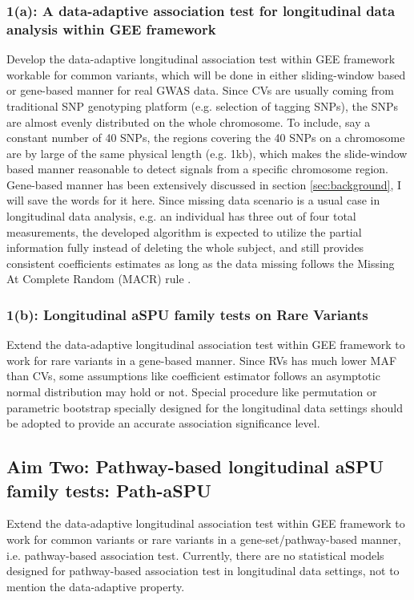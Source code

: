 \documentclass[12pt]{article}
\begin{document}
\subsubsection*{1(a): A data-adaptive association test for longitudinal data analysis within GEE framework}
Develop the data-adaptive longitudinal association test within GEE framework workable for common variants, which will be done in either sliding-window based or gene-based manner for real GWAS data. Since CVs are usually coming from traditional SNP genotyping platform (e.g. selection of tagging SNPs), the SNPs are almost evenly distributed on the whole chromosome. To include, say a constant number of 40 SNPs, the regions covering the 40 SNPs on a chromosome are by large of the same physical length (e.g. 1kb), which makes the slide-window based manner reasonable to detect signals from a specific chromosome region. Gene-based manner has been extensively discussed in section \ref{sec:background}, I will save the words for it here. Since missing data scenario is a usual case in longitudinal data analysis, e.g. an individual has three out of four total measurements, the developed algorithm is expected to utilize the partial information fully instead of deleting the whole subject, and still provides consistent coefficients estimates as long as the data missing follows the Missing At Complete Random (MACR) rule \cite{rubin1976inference,Xu2014}.
\subsubsection*{1(b): Longitudinal aSPU family tests on Rare Variants}
Extend the data-adaptive longitudinal association test within GEE framework to work for rare variants in a gene-based manner. Since RVs has much lower MAF than CVs, some assumptions like coefficient estimator follows an asymptotic normal distribution may hold or not. Special procedure like permutation or parametric bootstrap specially designed for the longitudinal data settings should be adopted to provide an accurate association significance level.
\subsection*{Aim Two: Pathway-based longitudinal aSPU family tests: Path-aSPU}
Extend the data-adaptive longitudinal association test within GEE framework to work for common variants or rare variants in a gene-set/pathway-based manner, i.e. pathway-based association test. Currently, there are no statistical models designed for pathway-based association test in longitudinal data settings, not to mention the data-adaptive property.
\end{document}
